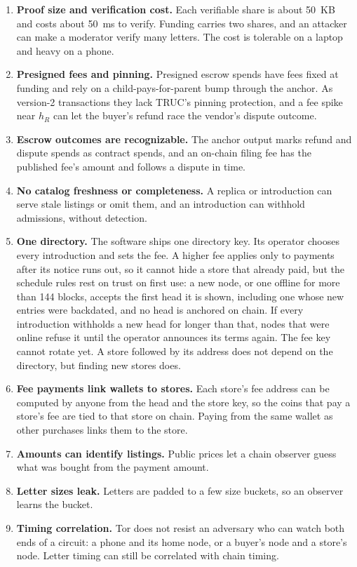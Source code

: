 \begin{enumerate}
  \item \textbf{Proof size and verification cost.} Each verifiable share is about 50~KB and costs about 50~ms to verify. Funding carries two shares, and an attacker can make a moderator verify many letters. The cost is tolerable on a laptop and heavy on a phone.
  \item \textbf{Presigned fees and pinning.} Presigned escrow spends have fees fixed at funding and rely on a child-pays-for-parent bump through the anchor. As version-2 transactions they lack TRUC's pinning protection, and a fee spike near $h_R$ can let the buyer's refund race the vendor's dispute outcome.
  \item \textbf{Escrow outcomes are recognizable.} The anchor output marks refund and dispute spends as contract spends, and an on-chain filing fee has the published fee's amount and follows a dispute in time.
  \item \textbf{No catalog freshness or completeness.} A replica or introduction can serve stale listings or omit them, and an introduction can withhold admissions, without detection.
  \item \textbf{One directory.} The software ships one directory key. Its operator chooses every introduction and sets the fee. A higher fee applies only to payments after its notice runs out, so it cannot hide a store that already paid, but the schedule rules rest on trust on first use: a new node, or one offline for more than 144 blocks, accepts the first head it is shown, including one whose new entries were backdated, and no head is anchored on chain. If every introduction withholds a new head for longer than that, nodes that were online refuse it until the operator announces its terms again. The fee key cannot rotate yet. A store followed by its address does not depend on the directory, but finding new stores does.
  \item \textbf{Fee payments link wallets to stores.} Each store's fee address can be computed by anyone from the head and the store key, so the coins that pay a store's fee are tied to that store on chain. Paying from the same wallet as other purchases links them to the store.
  \item \textbf{Amounts can identify listings.} Public prices let a chain observer guess what was bought from the payment amount.
  \item \textbf{Letter sizes leak.} Letters are padded to a few size buckets, so an observer learns the bucket.
  \item \textbf{Timing correlation.} Tor does not resist an adversary who can watch both ends of a circuit: a phone and its home node, or a buyer's node and a store's node. Letter timing can still be correlated with chain timing.

\end{enumerate}
